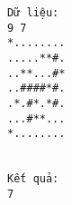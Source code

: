 \begin{verbatim}
Dữ liệu:
9 7
*........
.....**#.
..**...#*
..####*#.
.*.#*.*#.
...#**...
*........


Kết quả:
7


\end{verbatim}